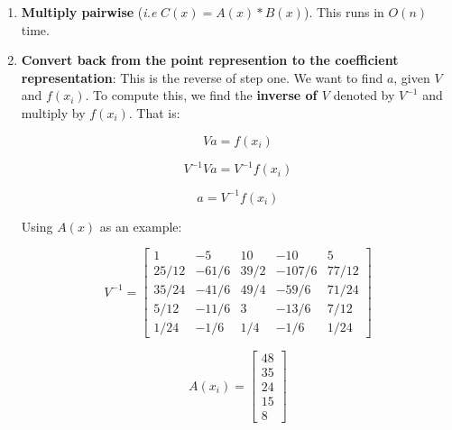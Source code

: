 \documentclass[11pt]{article}
\begin{document}
\begin{enumerate}
  \[a = \begin{bmatrix}a_0 \\ a_1 \\ a_2 \\ a_3 \\ a_4\end{bmatrix} = \begin{bmatrix}3 \\ -4 \\ 1 \\ 0 \\ 0\end{bmatrix}\]

  \[Va = A(x_i) = \begin{bmatrix}A(x_0) \\ A(x_1) \\ A(x_2) \\ A(x_3) \\ A(x_4)\end{bmatrix} = \begin{bmatrix}48 \\ 35 \\ 24 \\ 15 \\ 8 \end{bmatrix}\]
\item
  \textbf{Multiply pairwise} (\emph{i.e} \(C(x) = A(x) \ast B(x)\)).
  This runs in \(O(n)\) time.
\item
  \textbf{Convert back from the point represention to the coefficient
  representation}: This is the reverse of step one. We want to find
  \(a\), given \(V\) and \(f(x_i)\). To compute this, we find the
  \textbf{inverse of \(V\)} denoted by \(V^{-1}\) and multiply by
  \(f(x_i)\). That is:

  \[Va = f(x_i)\]

  \[V^{-1}Va = V^{-1}f(x_i)\]

  \[a = V^{-1}f(x_i)\]

  Using \(A(x)\) as an example:

  \[V^{-1} = \begin{bmatrix}1 & -5 & 10 & -10 & 5 \\ 25/12 & -61/6 & 39/2 & -107/6 & 77/12 \\ 35/24 & -41/6 & 49/4 & -59/6 & 71/24 \\5/12 & -11/6 & 3 & -13/6 & 7/12 \\1/24 & -1/6 & 1/4 & -1/6 & 1/24 \end{bmatrix}\]

  \[A(x_i) = \begin{bmatrix}48 \\ 35 \\ 24 \\ 15 \\ 8 \end{bmatrix}\]


\end{enumerate}
\end{document}
